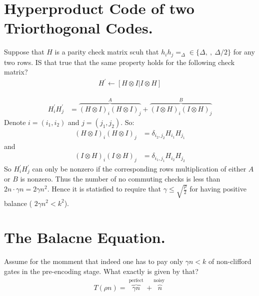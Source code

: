 \documentclass[manuscript,screen,review]{acmart}
\begin{document}
\section{Hyperproduct Code of two Triorthogonal Codes.}

Suppose that $H$ is a parity check matrix scuh that $h_{i}h_{j} =_{\Delta} \in
\{\Delta , \ , \ \Delta/2 \}$ for any two rows. IS that true that the same
property holds for the following check matrix?
\begin{equation*}
  \begin{split}
    H^{\prime} \leftarrow [ H \otimes I | I \otimes H ]
  \end{split}
\end{equation*}

\begin{equation*}
  \begin{split}
    H^{\prime}_{i}H^{\prime}_{j} &= \overbrace{ (H\otimes I)_{i}(H\otimes
    I)_{j}}^{A} + \overbrace{(I \otimes H)_{i}(I \otimes H)_{j}}^{B}
  \end{split}
\end{equation*}
Denote $i = (i_{1},i_{2})$ and $j = (j_{1},j_{2})$. So:
\begin{equation*}
  \begin{split}
    (H\otimes I)_{i}(H\otimes I)_{j} &= \delta_{i_{2},j_{2}} H_{i_{1}}H_{j_{1}}
  \end{split}
\end{equation*}
and
\begin{equation*}
  \begin{split}
    (I \otimes H)_{i}(I \otimes H)_{j} &= \delta_{i_{1},j_{1}}
    H_{i_{2}}H_{j_{2}}
  \end{split}
\end{equation*}
So $H^{\prime}_{i}H^{\prime}_{j}$ can only be nonzero if the corresponding rows
multiplication of either $A$ or $B$ is nonzero. Thus the number of no
commuting checks is less than  $2n\cdot\gamma n = 2\gamma n^{2}$. Hence it is
statisfied to require that $\gamma \le \sqrt{\frac{\rho}{2}}$ for having
positive balance ( $2\gamma n^{2} < k^{2} $).

\section{The Balacne Equation.}
Assume for the momment that indeed one has to pay only $\gamma n < k $ of
non-clifford gates in the pre-encoding stage. What exactly is given by that?
\begin{equation*}
  \begin{split}
    T(\rho n) = \overbrace{\gamma n}^{\text{ perfect }} +\overbrace{n}^{\text{
    noisy }}
  \end{split}
\end{equation*}
\end{document}
